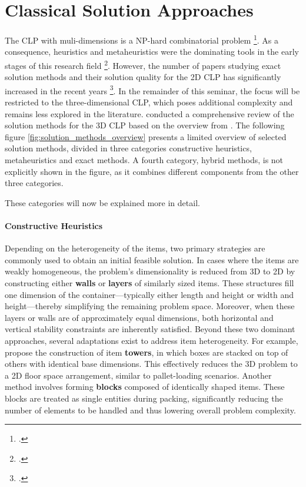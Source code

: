 \chapter{Classical Solution Approaches}
The \gls{CLP} with muli-dimensions is a NP-hard combinatorial problem \footcite[cf.][p.11]{bortfeldt_constraints_2013}.
As a consequence, heuristics and metaheuristics were the dominating tools
in the early stages of this research field  \footcite[cf.][]{pisinger_heuristics_2002}.
However, the number of papers studying exact solution methods and their solution quality
for the \gls{2D} \gls{CLP} has significantly increased in the recent years \footcite[cf.][p.23]{iori_exact_2021}.
In the remainder of this seminar, the focus will be restricted to the three-dimensional \gls{CLP},
which poses additional complexity and remains less explored in the literature.
\citeauthor{zhao_comparative_2016} conducted a comprehensive review of the solution methods
for the \gls{3D} \gls{CLP} based on the overview from \citeauthor{bortfeldt_constraints_2013}.
The following figure \ref{fig:solution_methods_overview} presents a limited overview of
selected solution methods, divided in three categories constructive heuristics, metaheuristics
and exact methods. A fourth category, hybrid methods, is not explicitly shown in the figure, as it combines different
components from the other three categories.



These categories will now be explained more in detail.

\subsubsection{Constructive Heuristics}

Depending on the heterogeneity of the items, two primary strategies are commonly used to
obtain an initial feasible solution. In cases where the items are weakly homogeneous,
the problem's dimensionality is reduced from \gls{3D} to \gls{2D} by constructing either
\textbf{walls} or \textbf{layers} of similarly sized items. These structures fill one
dimension of the container—typically either length and height or width and height—thereby
simplifying the remaining problem space. Moreover, when these layers or walls are of
approximately equal dimensions, both horizontal and vertical stability constraints are
inherently satisfied.
Beyond these two dominant approaches, several adaptations exist to address item heterogeneity.
For example, \citeauthor{gehring1997genetic} propose the construction of item
\textbf{towers}, in which boxes are stacked on top of others with identical base dimensions.
This effectively reduces the 3D problem to a 2D floor space arrangement,
similar to pallet-loading scenarios. Another method involves forming \textbf{blocks}
composed of identically shaped items. These blocks are treated as single entities
during packing, significantly reducing the number of elements to be handled and thus
lowering overall problem complexity.


